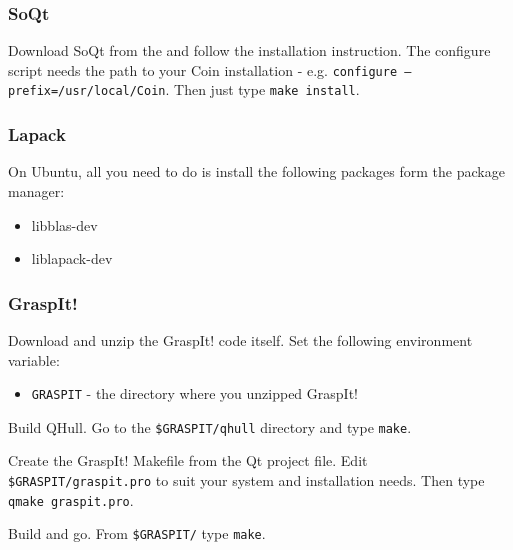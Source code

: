 \subsubsection{SoQt}

Download SoQt from the 
and follow the installation instruction. The configure script needs
the path to your Coin installation -
e.g. \texttt{configure~--prefix=/usr/local/Coin}. Then just type
\texttt{make install}.

\subsubsection{Lapack}

On Ubuntu, all you need to do is install the following packages form
the package manager:
\begin{itemize}
\item libblas-dev
\item liblapack-dev
\end{itemize}

\subsubsection{GraspIt!}

Download and unzip the GraspIt! code itself. Set the following
environment variable:

\begin{itemize}
\item \texttt{GRASPIT} - the directory where you unzipped GraspIt!
\end{itemize}

Build QHull. Go to the \texttt{\$GRASPIT/qhull} directory and type
\texttt{make}.

Create the GraspIt! Makefile from the Qt project file. Edit
\texttt{\$GRASPIT/graspit.pro} to suit your system and
installation needs. Then type \texttt{qmake graspit.pro}.

Build and go. From \texttt{\$GRASPIT/} type \texttt{make}.
